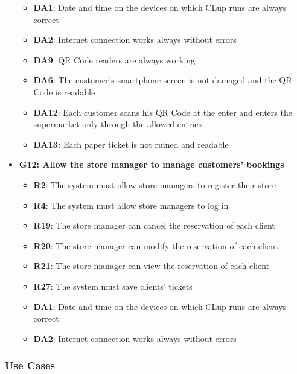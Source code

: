 \documentclass{article}
\begin{document}
\begin{itemize}
\begin{itemize}
						\item {\bfseries DA1}: Date and time on the devices on which CLup runs are always correct
						\item {\bfseries DA2}: Internet connection works always without errors
						\item {\bfseries DA9}: QR Code readers are always working
						\item{\bfseries DA6}: The customer’s smartphone screen is not damaged and the QR Code is readable
						\item {\bfseries DA12}: Each customer scans his QR Code at the enter and enters the supermarket only through the allowed entries
						\item {\bfseries DA13:} Each paper ticket is not ruined and readable
					
					\end{itemize}

				\item {\bfseries G12: Allow the store manager to manage customers’ bookings}	

					\begin{itemize}
						\item {\bfseries R2}: The system must allow store managers to register their store
						\item {\bfseries R4}: The system must allow store managers to log in
						\item {\bfseries R19}: The store manager can cancel the reservation of each client
						\item {\bfseries R20}: The store manager can modify the reservation of each client
						\item {\bfseries R21}: The store manager can view the reservation of each client
						\item {\bfseries R27}: The system must save clients’ tickets \\
		
						\item {\bfseries DA1}: Date and time on the devices on which CLup runs are always correct
						\item {\bfseries DA2}: Internet connection works always without errors
						\newpage
		
					\end{itemize}

			\end{itemize}

		\subsubsection{Use Cases}
		
\end{document}
